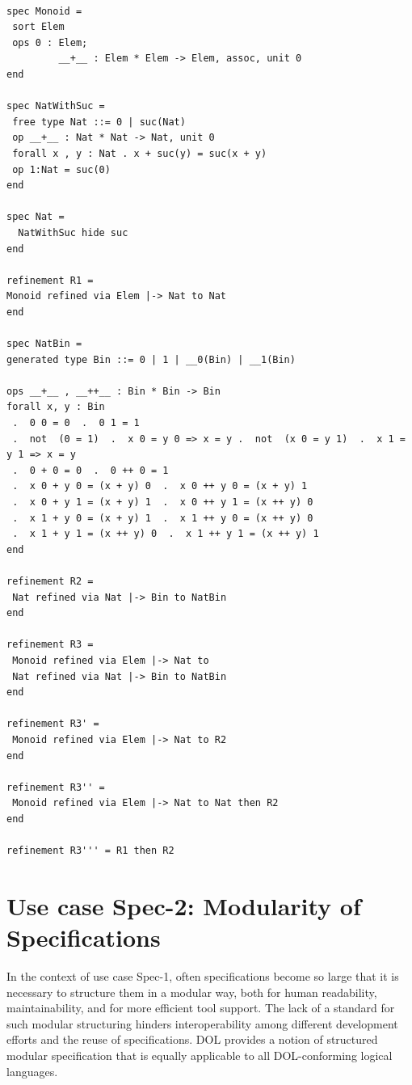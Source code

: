 \documentclass[10pt,fleqn,%
\ifpretendfinal
final%
\else
draft%
\fi,
]{scrreprt}
\begin{document}
\begin{lstlisting}[basicstyle=\ttfamily\footnotesize,language=dolText,morekeywords={sort, ops, refinement, free,spec type, assoc, unit,props,op,spec,refined, via,generated, then,ObjectProperty,Class,DisjointUnionOf,SubClassOf,Characteristics,Transitive,Asymmetric,SubPropertyOf,DisjointClasses,EquivalentTo,inverse,only,forall,iff,if,or,exists,bridge,distributed,from},escapechar=@,mathescape]	

spec Monoid =
 sort Elem
 ops 0 : Elem;
         __+__ : Elem * Elem -> Elem, assoc, unit 0
end

spec NatWithSuc =
 free type Nat ::= 0 | suc(Nat)
 op __+__ : Nat * Nat -> Nat, unit 0 
 forall x , y : Nat . x + suc(y) = suc(x + y)
 op 1:Nat = suc(0)
end

spec Nat =
  NatWithSuc hide suc
end

refinement R1 =
Monoid refined via Elem |-> Nat to Nat
end

spec NatBin =
generated type Bin ::= 0 | 1 | __0(Bin) | __1(Bin)

ops __+__ , __++__ : Bin * Bin -> Bin 
forall x, y : Bin 
 .  0 0 = 0  .  0 1 = 1
 .  not  (0 = 1)  .  x 0 = y 0 => x = y .  not  (x 0 = y 1)  .  x 1 = y 1 => x = y
 .  0 + 0 = 0  .  0 ++ 0 = 1 
 .  x 0 + y 0 = (x + y) 0  .  x 0 ++ y 0 = (x + y) 1
 .  x 0 + y 1 = (x + y) 1  .  x 0 ++ y 1 = (x ++ y) 0 
 .  x 1 + y 0 = (x + y) 1  .  x 1 ++ y 0 = (x ++ y) 0
 .  x 1 + y 1 = (x ++ y) 0  .  x 1 ++ y 1 = (x ++ y) 1 
end

refinement R2 =
 Nat refined via Nat |-> Bin to NatBin
end

refinement R3 =
 Monoid refined via Elem |-> Nat to
 Nat refined via Nat |-> Bin to NatBin
end

refinement R3' =
 Monoid refined via Elem |-> Nat to R2
end

refinement R3'' = 
 Monoid refined via Elem |-> Nat to Nat then R2
end

refinement R3''' = R1 then R2

\end{lstlisting}

\section{Use case Spec-2: Modularity of Specifications}
In the context of use case Spec-1, often specifications become so large that it is necessary to structure them in a modular way, both for human readability, 
maintainability, and for more efficient tool support. The lack of a standard for such modular structuring hinders interoperability among different development efforts 
and the reuse of specifications.
DOL  provides a notion of structured modular specification that is equally applicable to all DOL-conforming logical languages.
\end{document}
